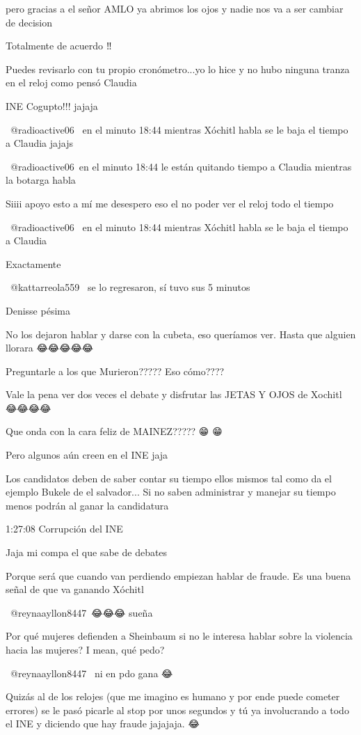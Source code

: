 pero gracias a el señor AMLO ya abrimos los ojos y nadie nos va a ser cambiar de decision

Totalmente de acuerdo ‼️

Puedes revisarlo con tu propio cronómetro...yo lo hice y no hubo ninguna tranza en el reloj como pensó Claudia

INE Cogupto!!! jajaja

​ @radioactive06  en el minuto 18:44 mientras Xóchitl habla se le baja el tiempo a Claudia jajajs

​ @radioactive06 en el minuto 18:44 le están quitando tiempo a Claudia mientras la botarga habla

Siiii apoyo esto a mí me desespero eso el no poder ver el reloj todo el tiempo

 @radioactive06  en el minuto 18:44 mientras Xóchitl habla se le baja el tiempo a Claudia

Exactamente

 @kattarreola559  se lo regresaron, sí tuvo sus 5 minutos

Denisse pésima

No los dejaron hablar y darse con la cubeta, eso queríamos ver. Hasta que alguien llorara 😂😂😂😂😂

Preguntarle a los que Murieron?????
Eso cómo????

Vale la pena ver dos veces el debate y disfrutar las JETAS Y OJOS de Xochitl 😂😂😂😂

Que onda con la cara feliz de MAINEZ?????  😁 😁

Pero algunos aún creen en el INE jaja

Los candidatos deben de saber contar su tiempo ellos mismos tal como da el ejemplo Bukele de el salvador... Si no saben administrar y manejar su tiempo menos podrán al ganar la candidatura

1:27:08 
Corrupción del INE

Jaja mi compa el que sabe de debates

Porque será que cuando van perdiendo empiezan hablar de fraude. Es una buena señal de que va ganando Xóchitl 👏🏻👏🏻👏🏻

​ @reynaayllon8447 😂😂😂 sueña

Por qué mujeres defienden a Sheinbaum si no le interesa hablar sobre la violencia hacia las mujeres? I mean, qué pedo?

​ @reynaayllon8447  ni en pdo gana 😂

Quizás al de los relojes (que me imagino es humano y por ende puede cometer errores) se le pasó picarle al stop por unos segundos y tú ya involucrando a todo el INE y diciendo que hay fraude jajajaja. 😂

